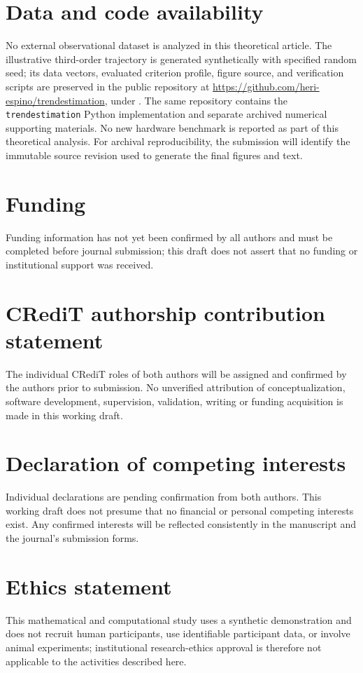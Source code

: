 \section*{Data and code availability}
No external observational dataset is analyzed in this theoretical article.
The illustrative third-order trajectory is generated synthetically with
specified random seed; its data vectors, evaluated criterion profile, figure
source, and verification scripts are preserved in the public repository at
\url{https://github.com/heri-espino/trendestimation}, under
. The same repository contains the
\texttt{trendestimation} Python implementation and separate archived
numerical supporting materials. No new hardware benchmark is reported
as part of this theoretical analysis. For archival reproducibility, the
submission will identify the immutable source revision used to generate
the final figures and text.

\section*{Funding}
Funding information has not yet been confirmed by all authors and must be
completed before journal submission; this draft does not assert that no
funding or institutional support was received.

\section*{CRediT authorship contribution statement}
The individual CRediT roles of both authors will be assigned and confirmed
by the authors prior to submission. No unverified attribution of
conceptualization, software development, supervision, validation,
writing or funding acquisition is made in this working draft.

\section*{Declaration of competing interests}
Individual declarations are pending confirmation from both authors.
This working draft does not presume that no financial or personal
competing interests exist. Any confirmed interests will be reflected
consistently in the manuscript and the journal's submission forms.

\section*{Ethics statement}
This mathematical and computational study uses a synthetic demonstration
and does not recruit human participants, use identifiable participant data,
or involve animal experiments; institutional research-ethics approval is
therefore not applicable to the activities described here.

